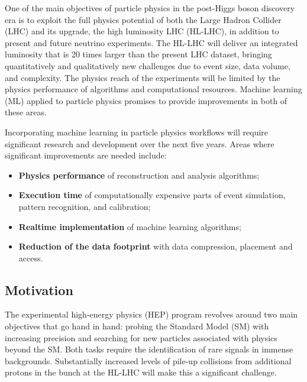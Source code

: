 

One of the main objectives of particle physics in the post-Higgs boson discovery era is to exploit the full physics potential of both the Large Hadron Collider (LHC) and its upgrade, the high luminosity LHC (HL-LHC), in addition to present and future neutrino experiments.
The HL-LHC will deliver an integrated luminosity that is 20 times larger than the present LHC dataset, bringing quantitatively and qualitatively new challenges due to event size, data volume, and complexity. The physics reach of the experiments will be limited by the physics performance of algorithms and computational resources. Machine learning (ML) applied to particle physics promises to provide improvements in both of these areas.

Incorporating machine learning in particle physics workflows will require significant research and development over the next five years. Areas where significant improvements are needed include:
\begin{itemize}
 \item \textbf{Physics performance} of reconstruction and analysis algorithms;
 \item \textbf{Execution time} of computationally expensive parts of event simulation, pattern recognition, and calibration;
 \item \textbf{Realtime implementation} of machine learning algorithms;
 \item \textbf{Reduction of the data footprint} with data compression, placement and access.
\end{itemize}
\noindent

\subsection{Motivation}
The experimental high-energy physics (HEP) program revolves around two main objectives that go hand in hand: probing the Standard Model (SM) with increasing precision and searching for new particles associated with physics beyond the SM. Both tasks require the identification of rare signals in immense backgrounds. Substantially increased levels of pile-up collisions from additional protons in the bunch at the HL-LHC will make this a significant challenge.

